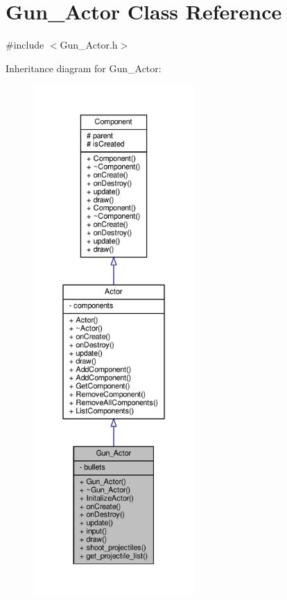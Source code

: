 \hypertarget{classGun__Actor}{}\section{Gun\+\_\+\+Actor Class Reference}
\label{classGun__Actor}


{\ttfamily \#include $<$Gun\+\_\+\+Actor.\+h$>$}



Inheritance diagram for Gun\+\_\+\+Actor\+:
\nopagebreak
\begin{figure}[H]
\begin{center}
\leavevmode
\includegraphics[height=550pt]{classGun__Actor__inherit__graph}
\end{center}
\end{figure}


